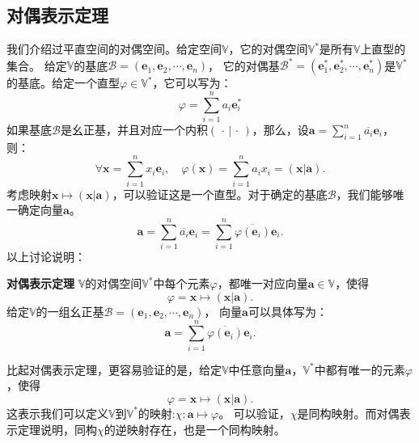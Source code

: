 \documentclass[12pt,UTF8]{ctexbook}
\begin{document}
\subsection{对偶表示定理}
我们介绍过平直空间的对偶空间。给定空间$\mathbb{V}$，它的对偶空间$\mathbb{V}^*$是所有$\mathbb{V}$上直型的集合。
给定$\mathbb{V}$的基底$\mathcal{B} = (\mathbf{e}_1, \mathbf{e}_2, \cdots , \mathbf{e}_n )$，
它的对偶基$\mathcal{B}^* = (\mathbf{e}_1^*, \mathbf{e}_2^*, \cdots , \mathbf{e}_n^*)$是$\mathbb{V}^*$的基底。给定一个直型$\varphi \in \mathbb{V}^*$，它可以写为：
$$ \varphi = \sum_{i=1}^n a_i \mathbf{e}_i^* $$
如果基底$\mathcal{B}$是幺正基，并且对应一个内积$(\,\cdot \,|\, \cdot\,)$，那么，设$ \mathbf{a} = \sum_{i=1}^n \overline{a_i} \mathbf{e}_i $，则：
$$ \forall \mathbf{x} = \sum_{i=1}^n x_i \mathbf{e}_i, \quad \varphi(\mathbf{x}) = \sum_{i=1}^n a_i x_i = (\mathbf{x} | \mathbf{a}). $$
考虑映射$\mathbf{x} \mapsto (\mathbf{x} | \mathbf{a})$，可以验证这是一个直型。对于确定的基底$\mathcal{B}$，我们能够唯一确定向量$\mathbf{a}$。
$$ \mathbf{a} = \sum_{i=1}^n \overline{a_i} \mathbf{e}_i = \sum_{i=1}^n \overline{\varphi(\mathbf{e}_i)} \mathbf{e}_i.$$
以上讨论说明：
\begin{pp}\textbf{对偶表示定理}\label{pp:8_2}
    $\mathbb{V}$的对偶空间$\mathbb{V}^*$中每个元素$\varphi$，都唯一对应向量$\mathbf{a} \in \mathbb{V}$，使得
    $$ \varphi = \mathbf{x} \mapsto (\mathbf{x} | \mathbf{a}). $$
    给定$\mathbb{V}$的一组幺正基$\mathcal{B} = (\mathbf{e}_1, \mathbf{e}_2, \cdots , \mathbf{e}_n )$，
    向量$\mathbf{a}$可以具体写为：
    $$ \mathbf{a} = \sum_{i=1}^n \overline{\varphi(\mathbf{e}_i)} \mathbf{e}_i.$$
\end{pp}

比起对偶表示定理，更容易验证的是，给定$\mathbb{V}$中任意向量$\mathbf{a}$，$\mathbb{V}^*$中都有唯一的元素$\varphi$，使得
$$ \varphi = \mathbf{x} \mapsto (\mathbf{x} | \mathbf{a}). $$
这表示我们可以定义$\mathbb{V}$到$\mathbb{V}^*$的映射:$\chi : \mathbf{a} \mapsto \varphi$。
可以验证，$\chi$是同构映射。而对偶表示定理说明，同构$\chi$的逆映射存在，也是一个同构映射。
\end{document}
